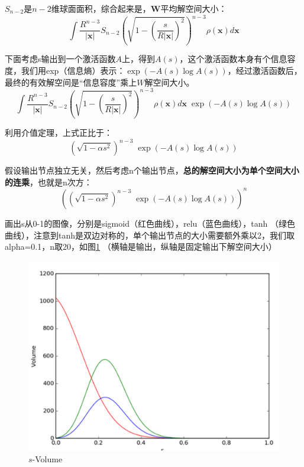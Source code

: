 \documentclass[11pt,fleqn, UTF8]{ctexbook} %
\begin{document}
$S_{n-2}$是$n-2$维球面面积，综合起来是，$\boldsymbol{W}$平均解空间大小：
\begin{equation*}
  \int \frac{R^{n-3}}{|\boldsymbol{x}|} S_{n-2} \left(\sqrt{1-\left(\frac{s}{R|\boldsymbol{x}|}\right)^{2}}\right)^{n-3} \rho(\boldsymbol{x}) d\boldsymbol{x}
\end{equation*}

下面考虑s输出到一个激活函数$A$上，得到$A(s)$，这个激活函数本身有个信息容度，我们用exp（信息熵）表示：$\exp(-A(s) \log A(s))$，经过激活函数后，最终的有效解空间是“信息容度”乘上$W$解空间大小。
\begin{equation*}
  \int \frac{R^{n-3}}{|\boldsymbol{x}|} S_{n-2} \left(\sqrt{1-\left(\frac{s}{R|\boldsymbol{x}|}\right)^{2}}\right)^{n-3} \rho(\boldsymbol{x}) d\boldsymbol{x} \; \exp(-A(s) \log A(s))
\end{equation*}

利用介值定理，上式正比于：
\begin{equation*}
  \left(\sqrt{1-\alpha s^2}\right)^{n-3} \; \exp(-A(s) \log A(s))
\end{equation*}

假设输出节点独立无关，然后考虑n个输出节点，\textbf{总的解空间大小为单个空间大小的连乘}，也就是n次方：
\begin{equation*}
  \left( \left(\sqrt{1-\alpha s^2}\right)^{n-3} \; \exp(-A(s) \log A(s)) \right) ^{n}
\end{equation*}

画出s从0-1的图像，分别是sigmoid（红色曲线），relu（蓝色曲线），tanh （绿色曲线），注意到tanh是双边对称的，单个输出节点的大小需要额外乘以2，我们取alpha=0.1，n取20，如图\ref{fig:5.3} （横轴是输出，纵轴是固定输出下解空间大小）

\begin{figure}[t]
 \centering
 \includegraphics{pics/53.png}
 \caption{$s$-Volume}
 \label{fig:5.3}
\end{figure}
\end{document}

